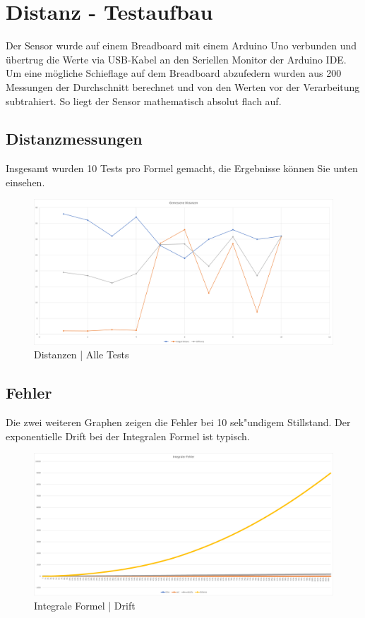 \section{Distanz - Testaufbau}
Der Sensor wurde auf einem Breadboard mit einem Arduino Uno verbunden und übertrug die Werte
via USB-Kabel an den Seriellen Monitor der Arduino IDE. Um eine mögliche Schieflage auf dem
Breadboard abzufedern wurden aus 200 Messungen der Durchschnitt berechnet und von den Werten vor
der Verarbeitung subtrahiert. So liegt der Sensor mathematisch absolut flach auf. \\

\subsection{Distanzmessungen}
Insgesamt wurden 10 Tests pro Formel gemacht, die Ergebnisse können Sie unten einsehen.\\

\begin{figure} [h]
    \centering
    \includegraphics[width = 15cm]{Bilder/_DistanzVergleich}
    \caption{Distanzen | Alle Tests}
    \end{figure}

\subsection{Fehler}
Die zwei weiteren Graphen zeigen die Fehler bei 10 sek"undigem Stillstand. Der exponentielle Drift 
bei der Integralen Formel ist typisch.

\begin{figure} [h]
    \centering
    \includegraphics[width = 15cm]{Bilder/_integralDistance001}
    \caption{Integrale Formel | Drift}
    \end{figure}

